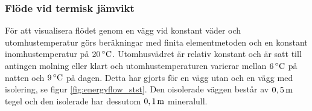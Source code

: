\subsubsection{Flöde vid termisk jämvikt}


För att visualisera flödet genom en vägg vid konstant väder och utomhustemperatur görs beräkningar med finita elementmetoden och en konstant inomhustemperatur på $\unit[20]{^\circ C}$. Utomhusvädret är relativ konstant och är satt till antingen molning eller klart och utomhustemperaturen varierar mellan $\unit[6]{^\circ C}$ på natten och $\unit[9]{^\circ C}$ på dagen. Detta har gjorts för en vägg utan och en vägg med isolering, se figur \ref{fig:energyflow_stst}. Den oisolerade väggen består av $\unit[0,5]{m}$ tegel och den isolerade har dessutom $\unit[0,1]{m}$ mineralull. %


